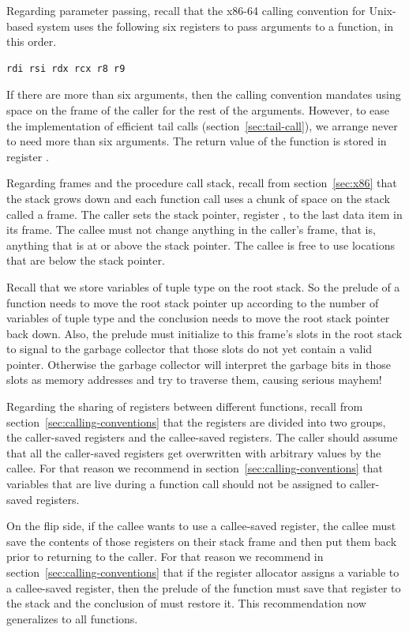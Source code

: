 \documentclass[7x10]{TimesAPriori_MIT}%
\numberwithin{theorem}{chapter}
\numberwithin{definition}{chapter}
\numberwithin{equation}{chapter}
\begin{document}
Regarding parameter passing, recall that the x86-64 calling
convention for Unix-based system uses the following six registers to
pass arguments to a function, in this order.
\begin{lstlisting}
rdi rsi rdx rcx r8 r9
\end{lstlisting}
If there are more than six arguments, then the calling convention
mandates using space on the frame of the caller for the rest of the
arguments. However, to ease the implementation of efficient tail calls
(section~\ref{sec:tail-call}), we arrange never to need more than six
arguments.
%
The return value of the function is stored in register .


Regarding frames  and the procedure call stack,
 recall from
section~\ref{sec:x86} that the stack grows down and each function call
uses a chunk of space on the stack called a frame. The caller sets the
stack pointer, register , to the last data item in its
frame. The callee must not change anything in the caller's frame, that
is, anything that is at or above the stack pointer. The callee is free
to use locations that are below the stack pointer.

Recall that we store variables of tuple type on the root stack.  So
the prelude of a function needs to move the root stack pointer
 up according to the number of variables of tuple type and
the conclusion needs to move the root stack pointer back down.  Also,
the prelude must initialize to  this frame's slots in the root
stack to signal to the garbage collector that those slots do not yet
contain a valid pointer. Otherwise the garbage collector will
interpret the garbage bits in those slots as memory addresses and try
to traverse them, causing serious mayhem!

Regarding the sharing of registers between different functions, recall
from section~\ref{sec:calling-conventions} that the registers are
divided into two groups, the caller-saved registers and the
callee-saved registers. The caller should assume that all the
caller-saved registers get overwritten with arbitrary values by the
callee. For that reason we recommend in
section~\ref{sec:calling-conventions} that variables that are live
during a function call should not be assigned to caller-saved
registers.

On the flip side, if the callee wants to use a callee-saved register,
the callee must save the contents of those registers on their stack
frame and then put them back prior to returning to the caller.  For
that reason we recommend in section~\ref{sec:calling-conventions} that if
the register allocator assigns a variable to a callee-saved register,
then the prelude of the  function must save that register
to the stack and the conclusion of  must restore it.  This
recommendation now generalizes to all functions.
\end{document}
